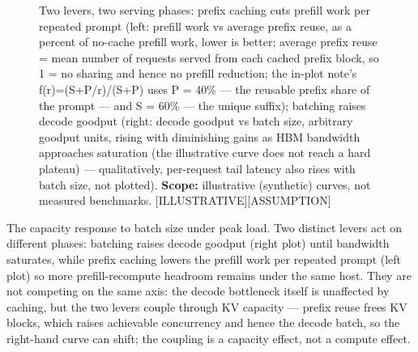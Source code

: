\begin{figure}
\centering
{}
\caption[Two levers, two serving phases]{Two levers, two serving phases: prefix caching cuts prefill work per repeated prompt (left: prefill work vs average prefix reuse, as a percent of no-cache prefill work, lower is better; average prefix reuse = mean number of requests served from each cached prefix block, so 1 = no sharing and hence no prefill reduction; the in-plot note's f(r)=(S+P/r)/(S+P) uses P = 40\% --- the reusable prefix share of the prompt --- and S = 60\% --- the unique suffix); batching raises decode goodput (right: decode goodput vs batch size, arbitrary goodput units, rising with diminishing gains as HBM bandwidth approaches saturation (the illustrative curve does not reach a hard plateau) --- qualitatively, per-request tail latency also rises with batch size, not plotted). \textbf{Scope:} illustrative (synthetic) curves, not measured benchmarks. \mbox{{[}ILLUSTRATIVE{]}}\hspace{0pt}\mbox{{[}ASSUMPTION{]}}}

\label{fig:15.2}\end{figure}

The capacity response to batch size under peak load. Two distinct levers
act on different phases: batching raises decode goodput (right plot)
until bandwidth saturates, while prefix caching lowers the prefill work
per repeated prompt (left plot) so more prefill‑recompute headroom
remains under the same host. They are not competing on the same axis:
the decode bottleneck itself is unaffected by caching, but the two
levers couple through KV capacity --- prefix reuse frees KV blocks,
which raises achievable concurrency and hence the decode batch, so the
right-hand curve can shift; the coupling is a capacity effect, not a
compute effect.

